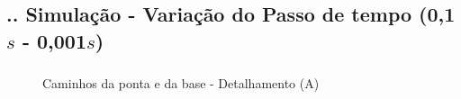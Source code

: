 \documentclass[aspectratio=169]{beamer}
\begin{document}
\subsection{\insertsectionnumber .\insertsubsectionnumber . Simulação - Variação do Passo de tempo (0,1$s$ - 0,001$s$)}

\begin{frame}
  \frametitle{\insertsubsection}
  \begin{figure}[H]
    \centering
    \caption{Caminhos da ponta e da base - Detalhamento (A)}
    \hfill
  \end{figure}
\end{frame}
\end{document}

